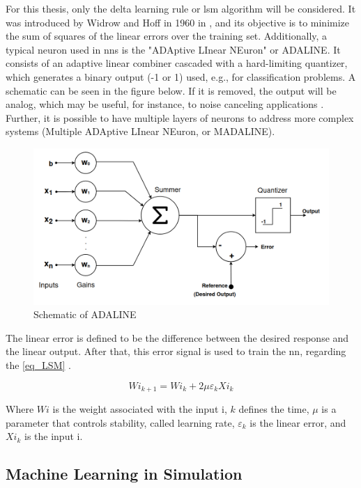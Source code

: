 For this thesis, only the delta learning rule or \gls{lsm} algorithm will be considered. It was introduced by Widrow and Hoff in 1960 in \cite{widrow1960adaptive}, and its objective is to minimize the sum of squares of the linear errors over the training set. Additionally, a typical neuron used in \glspl{nn} is the "ADAptive LInear NEuron" or ADALINE. It consists of an adaptive linear combiner cascaded with a hard-limiting quantizer, which generates a binary output (-1 or 1) used, e.g., for classification problems. A schematic can be seen in the figure below. If it is removed, the output will be analog, which may be useful, for instance, to noise canceling applications \cite{widrow1985adaptive}. Further, it is possible to have multiple layers of neurons to address more complex systems (Multiple ADAptive LInear NEuron, or MADALINE).

\begin{figure}[H]
	\centering
 	\includegraphics[width=0.8\linewidth]{Images/AdalineSquematic.png}
 	\caption{Schematic of ADALINE \cite{widrow1960adaptive}}
	 \label{fig_AdalineSquematic}
\end{figure}

The linear error is defined to be the difference between the desired response and the linear output. After that, this error signal is used to train the \gls{nn}, regarding the \autoref{eq_LSM} \cite{widrow1995perceptrons}.

\begin{equation}
    Wi_{k+1} = Wi_{k} + 2 \mu \varepsilon_{k}Xi_{k}
    \label{eq_LSM}
\end{equation}

Where $Wi$ is the weight associated with the input i, $k$ defines the time, $\mu$ is a parameter that controls stability, called learning rate, $\varepsilon_{k}$ is the linear error, and $Xi_{k}$ is the input i. 

\subsection{Machine Learning in Simulation}

